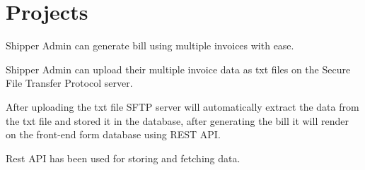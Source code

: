 \documentclass[]{deedy-resume-openfont}
\begin{document}
\begin{minipage}[t]{0.56\textwidth}

\vspace{5pt}
\section{Projects}
\begin{tightemize}
\item Shipper Admin can generate bill using multiple invoices with ease.
\end{tightemize}

\begin{tightemize}
\item Shipper Admin can upload their multiple invoice data as txt files on the Secure File Transfer Protocol server.
\item After uploading the txt file SFTP server will automatically extract the data from the txt file and stored it in the database, after generating the bill it will render on the front-end form database using REST API.
\item Rest API has been used for storing and fetching data.
\end{tightemize}
\sectionsep


\end{minipage}
\end{document}

